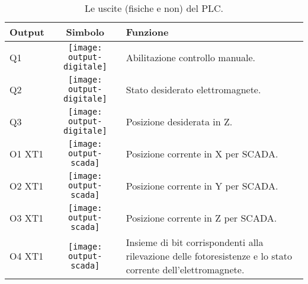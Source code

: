 \begin{table}[htbp]\centering
    \caption{Le uscite (fisiche e non) del PLC.}\label{tab:uscite-plc}
    \begin{tabularx}{\columnwidth}{@{}lcX@{}}\toprule
        \textbf{Output} & \textbf{Simbolo}                              & \textbf{Funzione}                                                                                            \\ \midrule
        Q1              & \texttt{[image: output-digitale]} & Abilitazione controllo manuale.                                                                              \\
        Q2              & \texttt{[image: output-digitale]} & Stato desiderato elettromagnete.                                                                             \\
        Q3              & \texttt{[image: output-digitale]} & Posizione desiderata in Z.                                                                                   \\
        O1 XT1          & \texttt{[image: output-scada]}    & Posizione corrente in X per SCADA.                                                                           \\
        O2 XT1          & \texttt{[image: output-scada]}    & Posizione corrente in Y per SCADA.                                                                           \\
        O3 XT1          & \texttt{[image: output-scada]}    & Posizione corrente in Z per SCADA.                                                                           \\
        O4 XT1          & \texttt{[image: output-scada]}    & Insieme di bit corrispondenti alla rilevazione delle fotoresistenze e lo stato corrente dell'elettromagnete. \\
    \bottomrule\end{tabularx}
\end{table}

